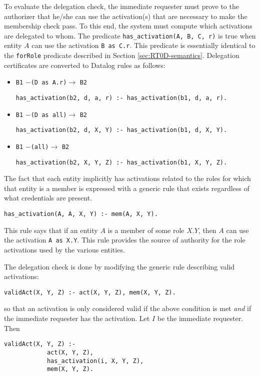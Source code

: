 \documentclass{article}
\newcommand{\predicate}[1]{\texttt{#1}}
\newcommand{\delcert}[3]{\texttt{#1} $-$\texttt{(#2)}$\rightarrow$ \texttt{#3}}
\newcommand{\activate}[2]{\texttt{#1 as #2}}
\begin{document}
To evaluate the delegation check, the immediate requester must prove to the authorizer that
he/she can use the activation(s) that are necessary to make the membership check pass. To this
end, the system must compute which activations are delegated to whom. The predicate
\predicate{has\_activation(A, B, C, r)} is true when entity $A$ can use the activation
\activate{B}{C.r}. This predicate is essentially identical to the \predicate{forRole} predicate
described in Section \ref{sec:RT0D-semantics}. Delegation certificates are converted to Datalog
rules as follows:

\begin{itemize}

\item \delcert{B1}{D as A.r}{B2}

\texttt{has\_activation(b2, d, a, r) :- has\_activation(b1, d, a, r).}

\item \delcert{B1}{D as all}{B2}

\texttt{has\_activation(b2, d, X, Y) :- has\_activation(b1, d, X, Y).}

\item \delcert{B1}{all}{B2}

\texttt{has\_activation(b2, X, Y, Z) :- has\_activation(b1, X, Y, Z).}

\end{itemize}

The fact that each entity implicitly has activations related to the roles for which that entity
is a member is expressed with a generic rule that exists regardless of what credentials are
present.

\texttt{has\_activation(A, A, X, Y) :- mem(A, X, Y).}

This rule says that if an entity $A$ is a member of some role $X.Y$, then $A$ can use the
activation \activate{A}{X.Y}. This rule provides the source of authority for the role
activations used by the various entities.

The delegation check is done by modifying the generic rule describing valid activations:

\texttt{validAct(X, Y, Z) :- act(X, Y, Z), mem(X, Y, Z).}

so that an activation is only considered valid if the above condition is met \emph{and} if the
immediate requester has the activation. Let $I$ be the immediate requester. Then

\begin{verbatim}
validAct(X, Y, Z) :-
            act(X, Y, Z),
            has_activation(i, X, Y, Z),
            mem(X, Y, Z).
\end{verbatim}
\end{document}
